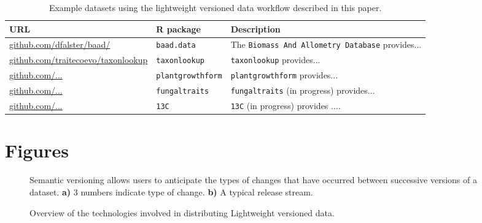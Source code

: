 \documentclass[a4paper,11pt]{article}
\newcommand{\ghsmurl}[1]{{\footnotesize\href{}{#1}}}
\begin{document}
\newpage

\begin{table}[h!]
\centering
\caption{Example datasets using the lightweight versioned data workflow described in this paper.}
{\footnotesize
\vspace{1cm}

  \begin{tabular}{p{7cm}p{4cm}p{2cm}}
  \hline
   \textbf{URL} & \textbf{R package} & \textbf{Description} \\ \hline
  \ghsmurl{github.com/dfalster/baad/} & \texttt{baad.data} & The \texttt{Biomass And Allometry Database} \citep{Falster-2015} provides...\\
  \ghsmurl{github.com/traitecoevo/taxonlookup} & \texttt{taxonlookup} & \texttt{taxonlookup} \citep{Pennell-2015a} provides...\\
  \ghsmurl{github.com/...} & \texttt{plantgrowthform}  & \texttt{plantgrowthform} provides... \\
  \ghsmurl{github.com/...} & \texttt{fungaltraits} & \texttt{fungaltraits} (in progress) provides... \\
  \ghsmurl{github.com/...} & \texttt{13C} & \texttt{13C} (in progress) provides .... \\
  \hline
  \end{tabular}
  }
\label{tab:examples}
\end{table}

\newpage
\section{Figures}

\begin{figure}[!hb]
\centering
\caption{Semantic versioning allows users to anticipate the types of changes that have occurred between successive versions of a dataset.
\textbf{a)} 3 numbers indicate type of change.
\textbf{b)} A typical release stream.}
\label{fig:semantic}
\end{figure}

\newpage


\begin{figure}[!hb]
\centering
\caption{Overview of the technologies involved in distributing Lightweight versioned data.}
\label{fig:technology_stack}
\end{figure}

\end{document}
